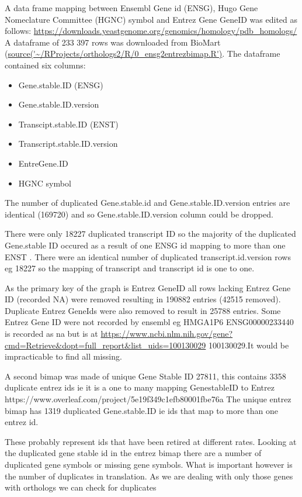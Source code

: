 A data frame mapping between Ensembl Gene id (ENSG), Hugo Gene Nomeclature Committee (HGNC) symbol and Entrez Gene GeneID was edited as follows:
\url{https://downloads.yeastgenome.org/genomics/homology/pdb_homologs/}
A dataframe of 233 397 rows was downloaded from BioMart (\url{source('~/RProjects/orthologs2/R/0_ensg2entrezbimap.R')}. The dataframe contained six columns:
\begin{itemize}
    \item Gene.stable.ID (ENSG)  
    \item Gene.stable.ID.version
    \item Transcipt.stable.ID (ENST)
    \item Transcript.stable.ID.version
    \item EntreGene.ID
    \item{HGNC symbol}
\end{itemize}           

The number of duplicated Gene.stable.id and Gene.stable.ID.version entries are identical (169720) and so Gene.stable.ID.version column could be dropped.

There were only 18227 duplicated transcript ID so the majority of the duplicated Gene.stable ID occured as a result of one ENSG id mapping to more than one ENST . There were an identical number of duplicated transcript.id.version rows eg 18227 so the mapping of transcript and transcript id is one to one. 
 
As the primary key of the graph is Entrez GeneID all rows lacking Entrez Gene ID (recorded NA) were removed resulting in 190882 entries (42515 removed). Duplicate Entrez GeneIds were also removed to result in 25788 entries. Some Entrez Gene ID were not recorded by ensembl eg HMGA1P6 ENSG00000233440 is recorded as na but is at \url{https://www.ncbi.nlm.nih.gov/gene?cmd=Retrieve&dopt=full_report&list_uids=100130029} 100130029.It would be impracticable to find all missing. 

A second bimap was made of unique Gene Stable ID  27811, this contains 3358 duplicate entrez ids ie it is a one to many mapping GenestableID to Entrez
https://www.overleaf.com/project/5e19f349c1efb80001fbe76a
The unique entrez bimap has 1319 duplicated Gene.stable.ID ie ids that map to more than one entrez id.

These probably represent ids that have been retired at different rates. Looking at the duplicated gene stable id in the entrez bimap there are a number of duplicated gene symbols or missing gene symbols. What is important however is the number of duplicates in translation. As we are dealing with only those genes with orthologs we can check for duplicates

